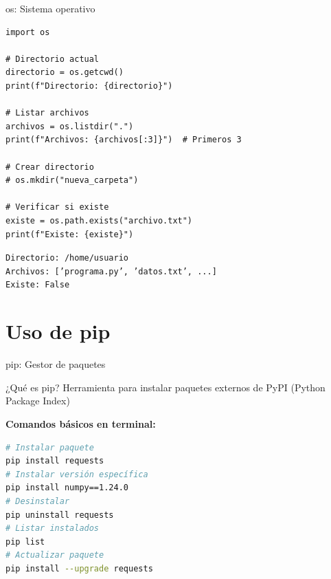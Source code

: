 \documentclass{beamer}
\begin{document}
\begin{frame}[fragile]{os: Sistema operativo \faFolder}
\begin{lstlisting}
import os

# Directorio actual
directorio = os.getcwd()
print(f"Directorio: {directorio}")

# Listar archivos
archivos = os.listdir(".")
print(f"Archivos: {archivos[:3]}")  # Primeros 3

# Crear directorio
# os.mkdir("nueva_carpeta")

# Verificar si existe
existe = os.path.exists("archivo.txt")
print(f"Existe: {existe}")
\end{lstlisting}

\vspace{-0.2cm}
\begin{tcolorbox}[colback=green!10,colframe=green,title={\small\faArrowCircleRight \ Salida (ejemplo)},coltitle=fg0,left=3pt,right=3pt,top=2pt,bottom=2pt,boxsep=1pt]
\small\texttt{Directorio: /home/usuario\\
Archivos: ['programa.py', 'datos.txt', ...]\\
Existe: False}
\end{tcolorbox}
\end{frame}

\section{Uso de pip}

\begin{frame}[fragile]{pip: Gestor de paquetes \faDownload}
\begin{conceptbox}{¿Qué es pip?}
Herramienta para instalar paquetes externos de PyPI (Python Package Index)
\end{conceptbox}

\vspace{0.2cm}
\textbf{Comandos básicos en terminal:}
\begin{lstlisting}[language=bash, numbers=none]
# Instalar paquete
pip install requests
# Instalar versión específica
pip install numpy==1.24.0
# Desinstalar
pip uninstall requests
# Listar instalados
pip list
# Actualizar paquete
pip install --upgrade requests
\end{lstlisting}
\end{frame}
\end{document}
